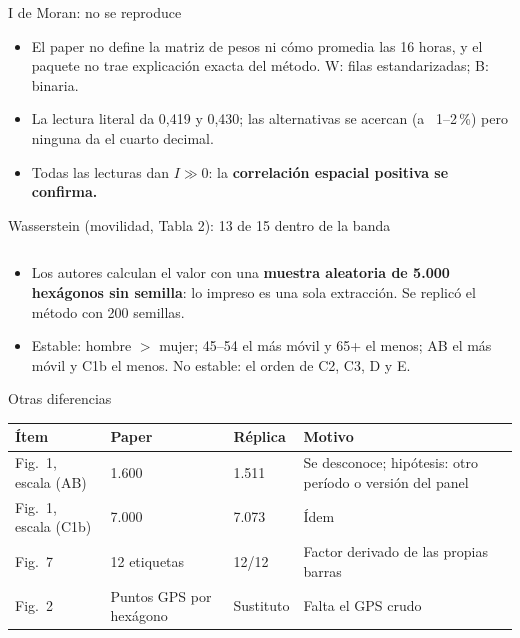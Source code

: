 \documentclass[aspectratio=169,10pt,t]{beamer}
\begin{document}
\begin{frame}{I de Moran: no se reproduce}
  \centering\footnotesize
  \\[4pt]
  \begin{flushleft}\footnotesize
    \begin{itemize}
      \item El paper no define la matriz de pesos ni cómo promedia las 16 horas, y el paquete no trae explicación exacta del método. W: filas estandarizadas; B: binaria.
      \item La lectura literal da 0,419 y 0,430; las alternativas se acercan (a ~1--2\,\%) pero ninguna da el cuarto decimal.
      \item Todas las lecturas dan $I\gg0$: la \textbf{correlación espacial positiva se confirma.}
    \end{itemize}
  \end{flushleft}
\end{frame}

\begin{frame}{Wasserstein (movilidad, Tabla 2): 13 de 15 dentro de la banda}
  \centering\scriptsize
  \begin{columns}[T]
    \centering
    \centering
  \end{columns}
  \vspace{4pt}
  \begin{flushleft}\footnotesize
    \begin{itemize}
      \item Los autores calculan el valor con una \textbf{muestra aleatoria de 5.000 hexágonos sin semilla}: lo impreso es una sola extracción. Se replicó el método con 200 semillas.
      \item Estable: hombre $>$ mujer; 45--54 el más móvil y 65+ el menos; AB el más móvil y C1b el menos. No estable: el orden de C2, C3, D y E.
    \end{itemize}
  \end{flushleft}
\end{frame}

\begin{frame}{Otras diferencias}
  \centering\footnotesize
  \setlength{\tabcolsep}{4pt}
  \begin{tabular}{p{2.3cm}p{2.7cm}p{2.9cm}p{4.6cm}}\toprule
    Ítem & Paper & Réplica & Motivo \\\midrule
    Fig.~1, escala (AB) & 1.600 & 1.511 & Se desconoce; hipótesis: otro período o versión del panel \\
    Fig.~1, escala (C1b) & 7.000 & 7.073 & Ídem \\
    Fig.~7 & 12 etiquetas & 12/12 & Factor derivado de las propias barras \\
    Fig.~2 & Puntos GPS por hexágono & Sustituto & Falta el GPS crudo \\
  \end{tabular}
\end{frame}
\end{document}
